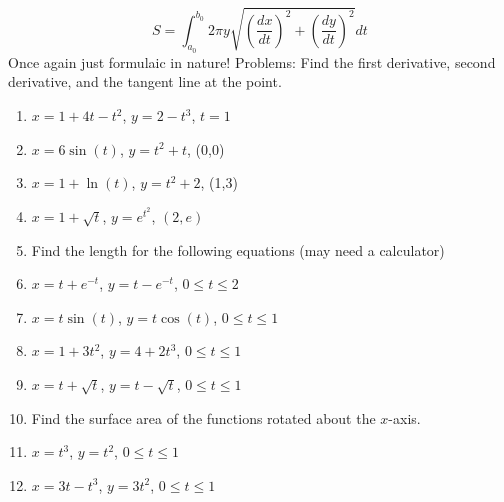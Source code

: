 \documentclass[10pt]{article}
\theoremstyle{Theorem}
\theoremstyle{definition}
\theoremstyle{remark}
\theoremstyle{custom}
\begin{document}
\begin{equation}
S=\int_{a_0}^{b_0}2\pi y\sqrt{\left(\dfrac{dx}{dt}\right)^2+\left(\dfrac{dy}{dt}\right)^2}dt
\end{equation}
Once again just formulaic in nature!
\newpage
\noindent Problems: Find the first derivative, second derivative, and the tangent line at the point.
\begin{enumerate}[1.]
\item $x=1+4t-t^2$, $y=2-t^3$, $t=1$
\item $x=6\sin(t)$, $y=t^2+t$, (0,0)
\item $x=1+\ln(t)$, $y=t^2+2$, (1,3)
\item $x=1+\sqrt{t}$, $y=e^{t^2}$, $(2,e)$
\item Find the length for the following equations (may need a calculator)
\item $x=t+e^{-t}$, $y=t-e^{-t}$, $0\leq t\leq 2$
\item $x=t\sin(t)$, $y=t\cos(t)$, $0\leq t\leq 1$
\item $x=1+3t^2$, $y=4+2t^3$, $0\leq t\leq 1$
\item $x=t+\sqrt{t}$, $y=t-\sqrt{t}$, $0\leq t\leq 1$
\item Find the surface area of the functions rotated about the $x$-axis.
\item $x=t^3$, $y=t^2$, $0\leq t\leq 1$
\item $x=3t-t^3$, $y=3t^2$, $0\leq t\leq 1$
\end{enumerate}
\end{document}
